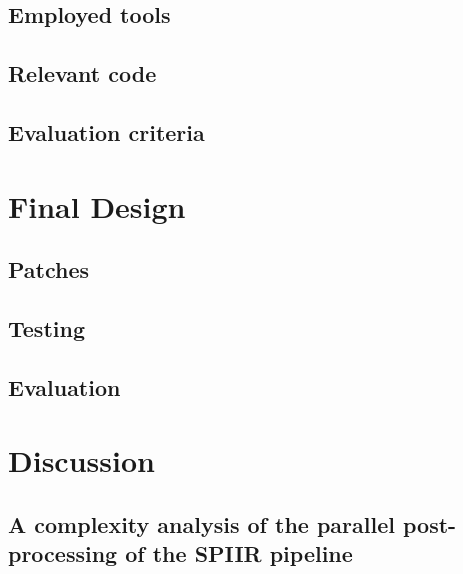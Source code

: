 \documentclass{article}
\begin{document}
\subsection{Employed tools} \label{sec:design_process:tools}

\subsection{Relevant code} \label{sec:design_process:code}

\subsection{Evaluation criteria} \label{sec:design_process:criteria}

\section{Final Design} \label{sec:final_design}

\subsection{Patches} \label{sec:final_design:patches}

\subsection{Testing} \label{sec:final_design:testing}

\subsection{Evaluation} \label{sec:final_design:evaluation}

\section{Discussion} \label{sec:discuss}

\subsection{A complexity analysis of the parallel post-processing of the SPIIR pipeline} \label{sec:discuss:analysis}
\end{document}
